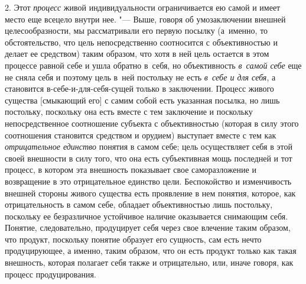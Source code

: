 2. Этот {\em процесс} живой индивидуальности ограничивается ею самой и
имеет место еще всецело внутри нее. "--- Выше, говоря об умозаключении
внешней целесообразности, мы рассматривали его первую посылку (а~именно, то
обстоятельство, что цель непосредственно соотносится с объективностью и
делает ее средством) таким образом, что хотя в ней цель остается в этом
процессе равной себе и ушла обратно в~себя, но объективность
{\em в~самой себе} еще не сняла себя и поэтому цель в~ней постольку не есть
{\em в~себе и для себя},
а становится в-себе-и-для-себя-сущей только в заключении.
Процесс живого существа [смыкающий его] с самим собой есть указанная
посылка, но лишь постольку, поскольку она есть вместе с тем заключение и
поскольку непосредственное соотношение субъекта с объективностью (которая в
силу этого соотношения становится средством и орудием) выступает вместе с
тем как {\em отрицательное единство}
понятия в самом себе; цель осуществляет себя в этой своей
внешности в силу того, что она есть субъективная мощь последней и тот
процесс, в котором эта внешность показывает свое саморазложение
и возвращение в это отрицательное единство цели.
Беспокойство и изменчивость внешней стороны живого существа есть проявление
в нем понятия, которое, как отрицательность в самом себе, обладает
объективностью лишь постольку, поскольку ее безразличное устойчивое наличие
оказывается снимающим себя. Понятие, следовательно, продуцирует себя через
свое влечение таким образом, что продукт, поскольку понятие образует его
сущность, сам есть нечто продуцирующее, а именно, таким образом, что он
есть продукт только как такая внешность, которая полагает себя также и
отрицательно, или, иначе говоря, как процесс продуцирования.

